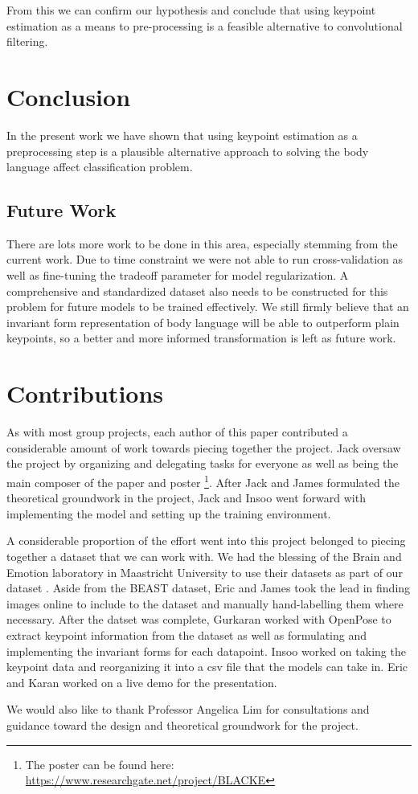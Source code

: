 \documentclass{article}
\begin{document}
From this we can confirm our hypothesis and conclude that using keypoint estimation as a means to pre-processing is a feasible alternative to convolutional filtering.

\section{Conclusion}

In the present work we have shown that using keypoint estimation as a preprocessing step is a plausible alternative approach to solving the body language affect classification problem.

\subsection{Future Work}

There are lots more work to be done in this area, especially stemming from the current work. Due to time constraint we were not able to run cross-validation as well as fine-tuning the tradeoff parameter for model regularization. A comprehensive and standardized dataset also needs to be constructed for this problem for future models to be trained effectively. We still firmly believe that an invariant form representation of body language will be able to outperform plain keypoints, so a better and more informed transformation is left as future work.

\section{Contributions}

As with most group projects, each author of this paper contributed a considerable amount of work towards piecing together the project. Jack oversaw the project by organizing and delegating tasks for everyone as well as being the main composer of the paper and poster \footnote{The poster can be found here: \url{https://www.researchgate.net/project/BLACKE}}. After Jack and James formulated the theoretical groundwork in the project, Jack and Insoo went forward with implementing the model and setting up the training environment.

A considerable proportion of the effort went into this project belonged to piecing together a dataset that we can work with. We had the blessing of the Brain and Emotion laboratory in Maastricht University to use their datasets as part of our dataset \citep{de2011bodily}\citep{stienen2012computational}. Aside from the BEAST dataset, Eric and James took the lead in finding images online to include to the dataset and manually hand-labelling them where necessary. After the datset was complete, Gurkaran worked with OpenPose to extract keypoint information from the dataset as well as formulating and implementing the invariant forms for each datapoint. Insoo worked on taking the keypoint data and reorganizing it into a csv file that the models can take in. Eric and Karan worked on a live demo for the presentation.

We would also like to thank Professor Angelica Lim for consultations and guidance toward the design and theoretical groundwork for the project.



\end{document}
